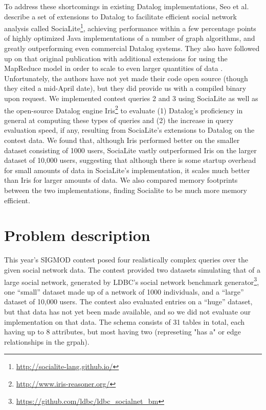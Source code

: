 \documentclass{article}
\begin{document}
\begin{multicols}{2}
To address these shortcomings in existing Datalog implementations, Seo et al. \cite{seo-et-al-13a} describe a set of extensions to Datalog to facilitate efficient social network analysis called SociaLite\footnote{\protect\url{http://socialite-lang.github.io/}}, achieving performance within a few percentage points of highly optimized Java implementations of a number of graph algorithms, and greatly outperforming even commercial Datalog systems. They also have followed up on that original publication with additional extensions for using the MapReduce model in order to scale to even larger quantities of data \cite{seo-et-al-13b}. Unfortunately, the authors have not yet made their code open source (though they cited a mid-April date), but they did provide us with a compiled binary upon request. We implemented contest queries 2 and 3 using SociaLite as well as the open-source Datalog engine Iris\footnote{\protect\url{http://www.iris-reasoner.org/}} to evaluate (1) Datalog's proficiency in general at computing these types of queries and (2) the increase in query evaluation speed, if any, resulting from SociaLite's extensions to Datalog on the contest data. We found that, although Iris performed better on the smaller dataset consisting of 1000 users, SociaLite vastly outperformed Iris on the larger dataset of 10,000 users, suggesting that although there is some startup overhead for small amounts of data in SociaLite's implementation, it scales much better than Iris for larger amounts of data. We also compared memory footprints between the two implementations, finding Socialite to be much more memory efficient.

\section{Problem description}

This year’s SIGMOD contest posed four realistically complex queries over the given social network data. The contest provided two datasets simulating that of a large social network, generated by LDBC's social network benchmark generator\footnote{\protect\url{https://github.com/ldbc/ldbc_socialnet_bm}}, one ``small'' dataset made up of a network of 1000 individuals, and a ``large'' dataset of 10,000 users. The contest also evaluated entries on a ``huge'' dataset, but that data has not yet been made available, and so we did not evaluate our implementation on that data. The schema consists of 31 tables in total, each having up to 8 attributes, but most having two (represeting "has a" or edge relationships in the grpah). 


\end{multicols}
\end{document}
